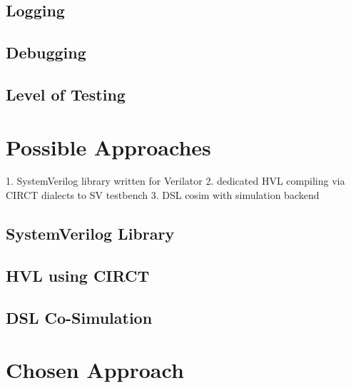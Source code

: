 \documentclass[12pt]{report}
\begin{document}
\subsection{Logging} %

\subsection{Debugging} %

\subsection{Level of Testing} %

\section{Possible Approaches} %

1. SystemVerilog library written for Verilator
2. dedicated HVL compiling via CIRCT dialects to SV testbench
3. DSL cosim with simulation backend

\subsection{SystemVerilog Library} %

\subsection{HVL using CIRCT} %

\subsection{DSL Co-Simulation} %

\section{Chosen Approach} %
\end{document}
